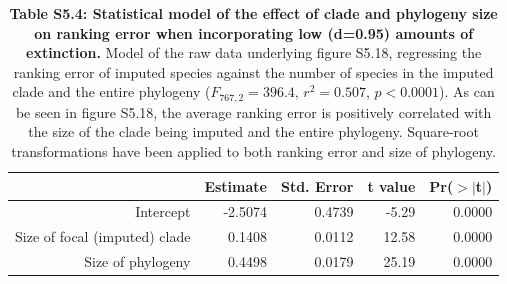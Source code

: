 \documentclass[10pt,english]{article}
\begin{document}
\begin{table}[ht]
  \centering
  \begin{tabular}{rrrrr}
    \hline
    & Estimate & Std. Error & t value & Pr($>$$|$t$|$) \\ \hline
    Intercept & -2.5074 & 0.4739 & -5.29 & 0.0000 \\
    Size of focal (imputed) clade & 0.1408 & 0.0112 & 12.58 & 0.0000 \\
    Size of phylogeny & 0.4498 & 0.0179 & 25.19 & 0.0000 \\
    \hline
  \end{tabular}
  \caption{\textbf{Table S5.4: Statistical model of the effect of clade and
      phylogeny size on ranking error when incorporating low (d=0.95) amounts of
      extinction.} Model of the raw data underlying figure S5.18, regressing the
      ranking error of imputed species against the number of species in the
      imputed clade and the entire phylogeny ($F_{767,2} = 396.4$, $r^2 =
      0.507$, $p < 0.0001$). As can be seen in figure S5.18, the average
      ranking error is positively correlated with the size of the clade being
      imputed and the entire phylogeny. Square-root transformations have been
      applied to both ranking error and size of phylogeny.}
\end{table}
\end{document}
